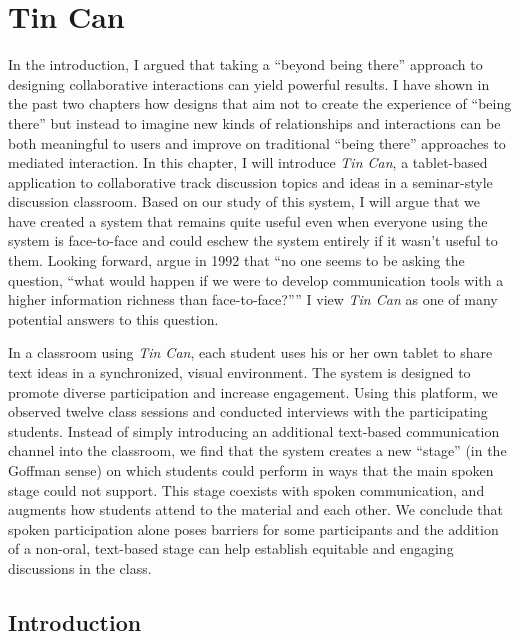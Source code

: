 \chapter{Tin Can}
\label{ch:tincan}

In the introduction, I argued that taking a ``beyond being there'' approach to designing collaborative interactions can yield powerful results. I have shown in the past two chapters how designs that aim not to create the experience of ``being there'' but instead to imagine new kinds of relationships and interactions can be both meaningful to users and improve on traditional ``being there'' approaches to mediated interaction. In this chapter, I will introduce \emph{Tin Can}, a tablet-based application to collaborative track discussion topics and ideas in a seminar-style discussion classroom. Based on our study of this system, I will argue that we have created a system that remains quite useful even when everyone using the system is face-to-face and could eschew the system entirely if it wasn't useful to them. Looking forward,  \citet{Hollan:1992tz} argue in 1992 that ``no one seems to be asking the question, ``what would happen if we were to develop communication tools with a higher information richness than face-to-face?'''' I view \emph{Tin Can} as one of many potential answers to this question.

In a classroom using \emph{Tin Can}, each student uses his or her own tablet to share text ideas in a synchronized, visual environment. The system is designed to promote diverse participation and increase engagement. Using this platform, we observed twelve class sessions and conducted interviews with the participating students. Instead of simply introducing an additional text-based communication channel into the classroom, we find that the system creates a new ``stage'' (in the Goffman sense) on which students could perform in ways that the main spoken stage could not support. This stage coexists with spoken communication, and augments how students attend to the material and each other. We conclude that spoken participation alone poses barriers for some participants and the addition of a non-oral, text-based stage can help establish equitable and engaging discussions in the class.


\section{Introduction}

